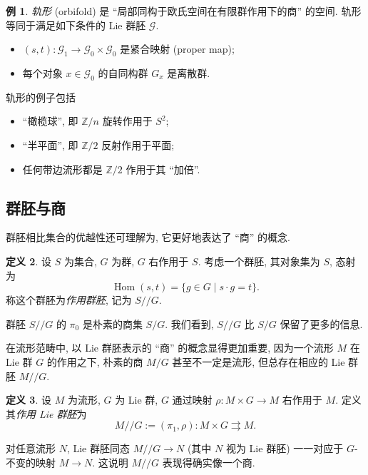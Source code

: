 \documentclass{article}
\theoremstyle{definition}
\newtheorem{definition}{定义}[section]
\newtheorem{example}[definition]{例}
\newcommand{\GroupoidQuotient}{/\!\!/}
\begin{document}
	\begin{example}
		\emph{轨形} (orbifold) 是 ``局部同构于欧氏空间在有限群作用下的商'' 的空间. 轨形等同于满足如下条件的 Lie 群胚 $\mathcal G$.
		\begin{itemize}
			\item $(s,t)\colon\mathcal G_1\to\mathcal G_0\times\mathcal G_0$ 是紧合映射 (proper map);
			\item 每个对象 $x\in\mathcal G_0$ 的自同构群 $G_x$ 是离散群.
		\end{itemize}
		轨形的例子包括
		\begin{itemize}
			\item ``橄榄球'', 即 $\mathbb{Z}/n$ 旋转作用于 $S^2$;
			\item ``半平面'', 即 $\mathbb{Z}/2$ 反射作用于平面;
			\item 任何带边流形都是 $\mathbb{Z}/2$ 作用于其 ``加倍''.
		\end{itemize}
	\end{example}
	
	\subsection{群胚与商}
	
	群胚相比集合的优越性还可理解为, 它更好地表达了 ``商'' 的概念.
	
	\begin{definition}
		设 $S$ 为集合, $G$ 为群, $G$ 右作用于 $S$. 考虑一个群胚, 其对象集为 $S$, 态射为
		$$
		\operatorname{Hom}(s,t)=\{g\in G\mid s\cdot g=t\}.
		$$
		称这个群胚为\emph{作用群胚}, 记为 $S \GroupoidQuotient G$.
	\end{definition}
	
	群胚 $S\GroupoidQuotient G$ 的 $\pi_0$ 是朴素的商集 $S/G$. 我们看到, $S\GroupoidQuotient G$ 比 $S/G$ 保留了更多的信息.
	
	在流形范畴中, 以 Lie 群胚表示的 ``商'' 的概念显得更加重要, 因为一个流形 $M$ 在 Lie 群 $G$ 的作用之下, 朴素的商 $M/G$ 甚至不一定是流形, 但总存在相应的 Lie 群胚 $M\GroupoidQuotient G$.
	
	\begin{definition}
		设 $M$ 为流形, $G$ 为 Lie 群, $G$ 通过映射 $\rho\colon M\times G\to M$ 右作用于 $M$. 定义其\emph{作用 Lie 群胚}为
		$$
		M\GroupoidQuotient G := (\pi_1,\rho)\colon M\times G\rightrightarrows M.
		$$
	\end{definition}
	
	对任意流形 $N$, Lie 群胚同态 $M\GroupoidQuotient G \to N$ (其中 $N$ 视为 Lie 群胚) 一一对应于 $G$-不变的映射 $M\to N$. 这说明 $M\GroupoidQuotient G$ 表现得确实像一个商.
	
\end{document}
